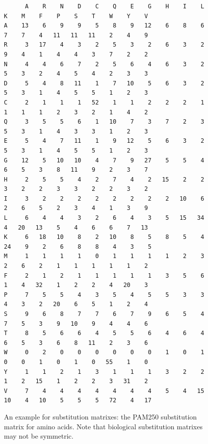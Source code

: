 \begin{figure}
\centering
\scriptsize
\begin{verbatim}
      A    R    N    D    C    Q    E    G    H    I    L    K    M    F    P    S    T    W    Y    V
A    13    6    9    9    5    8    9   12    6    8    6    7    7    4   11   11   11    2    4    9
R     3   17    4    3    2    5    3    2    6    3    2    9    4    1    4    4    3    7    2    2
N     4    4    6    7    2    5    6    4    6    3    2    5    3    2    4    5    4    2    3    3
D     5    4    8   11    1    7   10    5    6    3    2    5    3    1    4    5    5    1    2    3
C     2    1    1    1   52    1    1    2    2    2    1    1    1    1    2    3    2    1    4    2
Q     3    5    5    6    1   10    7    3    7    2    3    5    3    1    4    3    3    1    2    3
E     5    4    7   11    1    9   12    5    6    3    2    5    3    1    4    5    5    1    2    3
G    12    5   10   10    4    7    9   27    5    5    4    6    5    3    8   11    9    2    3    7
H     2    5    5    4    2    7    4    2   15    2    2    3    2    2    3    3    2    2    3    2
I     3    2    2    2    2    2    2    2    2   10    6    2    6    5    2    3    4    1    3    9
L     6    4    4    3    2    6    4    3    5   15   34    4   20   13    5    4    6    6    7   13
K     6   18   10    8    2   10    8    5    8    5    4   24    9    2    6    8    8    4    3    5
M     1    1    1    1    0    1    1    1    1    2    3    2    6    2    1    1    1    1    1    2
F     2    1    2    1    1    1    1    1    3    5    6    1    4   32    1    2    2    4   20    3
P     7    5    5    4    3    5    4    5    5    3    3    4    3    2   20    6    5    1    2    4
S     9    6    8    7    7    6    7    9    6    5    4    7    5    3    9   10    9    4    4    6
T     8    5    6    6    4    5    5    6    4    6    4    6    5    3    6    8   11    2    3    6
W     0    2    0    0    0    0    0    0    1    0    1    0    0    1    0    1    0   55    1    0
Y     1    1    2    1    3    1    1    1    3    2    2    1    2   15    1    2    2    3   31    2
V     7    4    4    4    4    4    4    4    5    4   15   10    4   10    5    5    5   72    4   17
	\end{verbatim}
\normalsize
	\caption{An example for substitution matrixes: the PAM250 substitution matrix for amino acids\cite{dayhoff1978}. Note that biological substitution matrixes may not be symmetric.}
	\label{fig:submatexample}
\end{figure}
